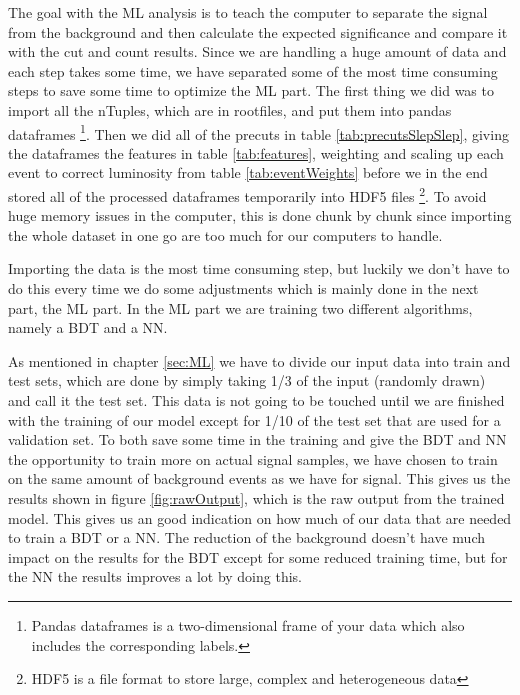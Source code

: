 The goal with the ML analysis is to teach the computer to separate the signal from the background and then calculate the expected significance and compare it with the cut and count results. Since we are handling a huge amount of data and each step takes some time, we have separated some of the most time consuming steps to save some time to optimize the ML part. The first thing we did was to import all the nTuples, which are in rootfiles, and put them into pandas dataframes \footnote{Pandas dataframes \cite{PD} is a two-dimensional frame of your data which also includes the corresponding labels.}. Then we did all of the precuts in table \ref{tab:precutsSlepSlep}, giving the dataframes the features in table \ref{tab:features}, weighting and scaling up each event to correct luminosity from table \ref{tab:eventWeights} before we in the end stored all of the processed dataframes temporarily into HDF5 files \footnote{HDF5 \cite{hdf5} is a file format to store large, complex and heterogeneous data}. To avoid huge memory issues in the computer, this is done chunk by chunk since importing the whole dataset in one go are too much for our computers to handle. 

Importing the data is the most time consuming step, but luckily we don't have to do this every time we do some adjustments which is mainly done in the next part, the ML part. In the ML part we are training two different algorithms, namely a BDT and a NN. 

As mentioned in chapter \ref{sec:ML} we have to divide our input data into train and test sets, which are done by simply taking 1/3 of the input (randomly drawn) and call it the test set. This data is not going to be touched until we are finished with the training of our model except for 1/10 of the test set that are used for a validation set. To both save some time in the training and give the BDT and NN the opportunity to train more on actual signal samples, we have chosen to train on the same amount of background events as we have for signal. This gives us the results shown in figure \ref{fig:rawOutput}, which is the raw output from the trained model. This gives us an good indication on how much of our data that are needed to train a BDT or a NN. The reduction of the background doesn't have much impact on the results for the BDT except for some reduced training time, but for the NN the results improves a lot by doing this. 


